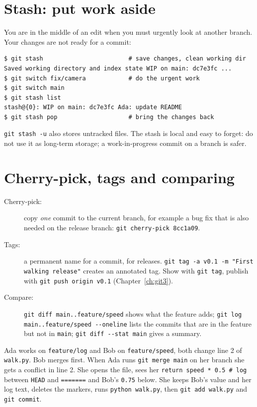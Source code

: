 \section*{Stash: put work aside}
You are in the middle of an edit when you must urgently look at another branch. Your changes are not ready for a commit:
\begin{verbatim}
$ git stash                        # save changes, clean working dir
Saved working directory and index state WIP on main: dc7e3fc ...
$ git switch fix/camera            # do the urgent work
$ git switch main
$ git stash list
stash@{0}: WIP on main: dc7e3fc Ada: update README
$ git stash pop                    # bring the changes back
\end{verbatim}
\texttt{git stash -u} also stores untracked files. The stash is local and easy to forget: do not use it as long-term storage; a work-in-progress commit on a branch is safer.

\section*{Cherry-pick, tags and comparing}
\begin{description}
  \item[Cherry-pick:] copy \emph{one} commit to the current branch, for example a bug fix that is also needed on the release branch: \verb!git cherry-pick 8cc1a09!.
  \item[Tags:] a permanent name for a commit, for releases. \verb!git tag -a v0.1 -m "First walking release"! creates an annotated tag. Show with \texttt{git tag}, publish with \verb!git push origin v0.1! (Chapter~\ref{ch:git3}).
  \item[Compare:] \verb!git diff main..feature/speed! shows what the feature adds; \verb!git log main..feature/speed --oneline! lists the commits that are in the feature but not in \texttt{main}; \verb!git diff --stat main! gives a summary.
\end{description}

\begin{example}
Ada works on \texttt{feature/log} and Bob on \texttt{feature/speed}, both change line 2 of \texttt{walk.py}. Bob merges first. When Ada runs \texttt{git merge main} on her branch she gets a conflict in line 2. She opens the file, sees her \texttt{return speed * 0.5 \# log} between \texttt{HEAD} and \texttt{=======} and Bob's \texttt{0.75} below. She keeps Bob's value and her log text, deletes the markers, runs \texttt{python walk.py}, then \verb!git add walk.py! and \verb!git commit!.
\end{example}

